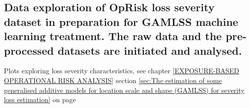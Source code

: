 \documentclass[
]{article}
\begin{document}
\normalsize

\subsection{Data exploration of OpRisk loss severity dataset in preparation for GAMLSS machine learning treatment. The raw data and the pre-processed datasets are initiated and analysed.}
\label{ssec:Data exploration GAMLSS}

Plots exploring loss severity characteristics, see chapter
\ref{EXPOSURE-BASED OPERATIONAL RISK ANALYSIS} section
\ref{sec:The estimation of some  generalised additive models for location scale and shape (GAMLSS) for severity loss estimation}
on page
\pageref{sec:The estimation of some  generalised additive models for location scale and shape (GAMLSS) for severity loss estimation}

\small
\end{document}
